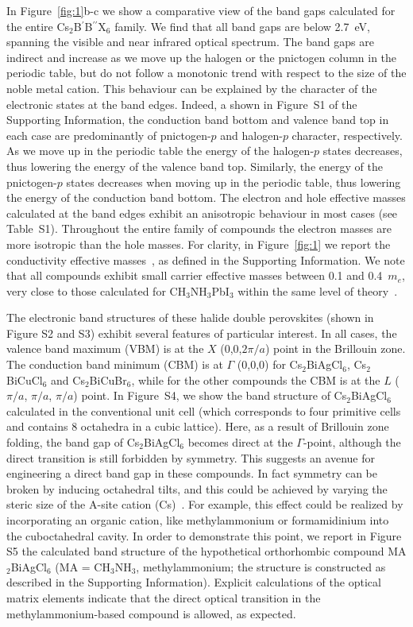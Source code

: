 \documentclass[journal=jpcl,manuscript=letter,layout=traditional]{achemso}
\begin{document}
In Figure~\ref{fig:1}b-c we show a comparative view of the band gaps calculated for the entire Cs$_2$B$^\prime$B$^{\prime\prime}$X$_6$ family.
We find that all band gaps are below 2.7~eV, spanning the visible and near infrared optical spectrum. The band gaps are
indirect and increase as we move up the halogen or the pnictogen column in the periodic table, but do not follow a monotonic
trend with respect to the size of the noble metal cation. This behaviour can be explained by the character of the electronic
states at the band edges. Indeed, a shown in Figure~S1 of the Supporting Information, the conduction band bottom and
valence band top in each case are predominantly of pnictogen-$p$ and halogen-$p$ character, respectively. As we move up in
the periodic table the energy of the halogen-$p$ states decreases, thus lowering the energy of the valence band top. Similarly,
the energy of the pnictogen-$p$ states decreases when moving up in the periodic table, thus lowering
the energy of the conduction band bottom. The electron and hole effective masses calculated at the band edges exhibit an
anisotropic behaviour in most cases (see Table~S1). Throughout the entire family of compounds the electron masses are more isotropic than the hole masses. For clarity, in
Figure~\ref{fig:1} we report the conductivity effective masses~\cite{Galli2014}, as defined in the Supporting Information.
We note that all compounds exhibit small carrier effective masses between 0.1 and 0.4~$m_e$, very close to those calculated
for CH$_3$NH$_3$PbI$_3$ within the same level of theory~\cite{Filip2015-2}.


The electronic band structures of these  halide double perovskites (shown in Figure S2 and S3) exhibit
several features of particular interest. In all cases, the valence band maximum (VBM) is at the $X$ (0,0,$2\pi/a$) point in the Brillouin
zone. The conduction band minimum (CBM) is at  $\Gamma$ (0,0,0) for Cs$_2$BiAgCl$_6$, Cs$_2$BiCuCl$_6$ and Cs$_2$BiCuBr$_6$, while
for the other compounds the CBM is at the $L$ ($\pi/a$, $\pi/a$, $\pi/a$) point.
In Figure~S4, we show the band structure of Cs$_2$BiAgCl$_6$  calculated in the conventional unit cell (which corresponds to four primitive cells and contains 8 octahedra in a cubic lattice). Here, as a result of Brillouin zone folding, the band gap of Cs$_2$BiAgCl$_6$  becomes direct at the $\Gamma$-point, although the direct transition is still forbidden by symmetry. This suggests an avenue for engineering a direct band gap in these compounds. In fact symmetry can be broken by inducing octahedral tilts, and this could be achieved by varying the steric size of the A-site cation (Cs)~\cite{Filip2014-1}. For example, this effect could be realized by incorporating an organic cation, like methylammonium or formamidinium into the cuboctahedral cavity. In order to demonstrate this point, we report in Figure S5 the calculated band structure of the hypothetical orthorhombic compound MA$_2$BiAgCl$_6$ (MA = CH$_3$NH$_3$, methylammonium; the structure is constructed as described in the Supporting Information). Explicit calculations of the optical matrix elements indicate that the direct optical transition in the methylammonium-based compound is  allowed, as expected.
\end{document}
